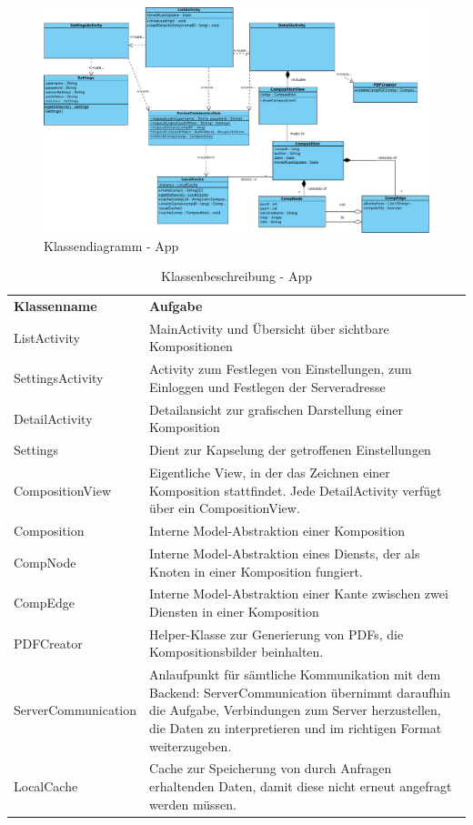 \begin{figure}[h]
	\centering
	\includegraphics[width=\textwidth]{Klassendiagramm_App/Class_Diagram1}
	\caption{Klassendiagramm - App}
	\label{fig:klassendiagramm-a}
\end{figure}

\begin{table}[h]
	\centering
	\begin{tabularx}{\textwidth}{X X}
		\rowcolor[HTML]{C0C0C0} 
		\textbf{Klassenname} & \textbf{Aufgabe} \\
		ListActivity & MainActivity und Übersicht über sichtbare Kompositionen  \\
		\rowcolor[HTML]{E7E7E7} 
		SettingsActivity & Activity zum Festlegen von Einstellungen, zum Einloggen und Festlegen der Serveradresse \\
		DetailActivity & Detailansicht zur grafischen Darstellung einer Komposition \\
		\rowcolor[HTML]{E7E7E7} 
		Settings & Dient zur Kapselung der getroffenen Einstellungen \\
		CompositionView & Eigentliche View, in der das Zeichnen einer Komposition stattfindet. Jede DetailActivity verfügt über ein CompositionView. \\
		\rowcolor[HTML]{E7E7E7} 
		Composition & Interne Model-Abstraktion einer Komposition \\
		CompNode & Interne Model-Abstraktion eines Diensts, der als Knoten in einer Komposition fungiert. \\
		\rowcolor[HTML]{E7E7E7} 
		CompEdge & Interne Model-Abstraktion einer Kante zwischen zwei Diensten in einer Komposition \\
		PDFCreator & Helper-Klasse zur Generierung von PDFs, die Kompositionsbilder beinhalten. \\
			\rowcolor[HTML]{E7E7E7} 
		ServerCommunication & Anlaufpunkt für sämtliche Kommunikation mit dem Backend: ServerCommunication übernimmt daraufhin die Aufgabe, Verbindungen zum Server herzustellen, die Daten zu interpretieren und im richtigen Format weiterzugeben. \\
		LocalCache & Cache zur Speicherung von durch Anfragen erhaltenden Daten, damit diese nicht erneut angefragt werden müssen. 
	\end{tabularx}
	\caption{Klassenbeschreibung - App}
	\label{table:klassenbeschreibung-a}
\end{table}